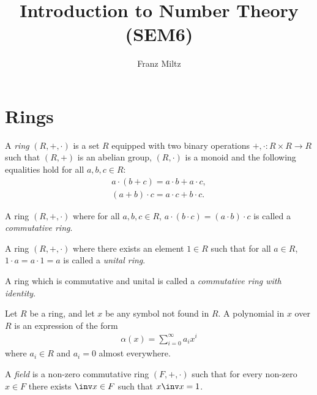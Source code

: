 \documentclass{article}
\begin{document}
\mkthmstwounified
\title{Introduction to Number Theory (SEM6)}
\author{Franz Miltz}
\maketitle
\tableofcontents
\pagebreak

\section{Rings}

\begin{definition}[Ring]
	A \emph{ring} $(R,+,\cdot)$ is a set $R$ equipped with two binary operations
	$+,\cdot:R\times R\to R$ such that $(R,+)$ is an abelian group, $(R,\cdot)$
	is a monoid and the following equalities hold for all $a,b,c\in R$:
	\begin{align*}
		a       \cdot (b + c)   = a \cdot b + a \cdot c, \\
		(a+b)   \cdot c         = a \cdot c + b \cdot c.
	\end{align*}
\end{definition}

\begin{definition}
	A ring $(R,+,\cdot)$ where for all $a,b,c\in R$, $a\cdot(b\cdot c) = (a\cdot b)\cdot c$
	is called a \emph{commutative ring}.
\end{definition}

\begin{definition}
	A ring $(R,+,\cdot)$ where there exists an element $1\in R$ such that
	for all $a\in R$, $1\cdot a = a \cdot 1 = a$ is called a \emph{unital ring}.
\end{definition}

\begin{definition}
	A ring which is commutative and unital is called a \emph{commutative ring
		with identity}.
\end{definition}

\begin{definition}
	Let $R$ be a ring, and let $x$ be any symbol not found in $R$. A polynomial in $x$ over $R$
	is an expression of the form
	\begin{align*}
		\alpha(x)=\sum_{i=0}^\infty a_ix^i
	\end{align*}
	where $a_i\in R$ and $a_i=0$ almost everywhere.
\end{definition}

\begin{definition}
	A \emph{field} is a non-zero commutative ring $(F, +, \cdot)$ such that for every non-zero 
	$x\in F$ there exists $\inv x\in F$ such that $x\inv x = 1$.
\end{definition}
\end{document}
